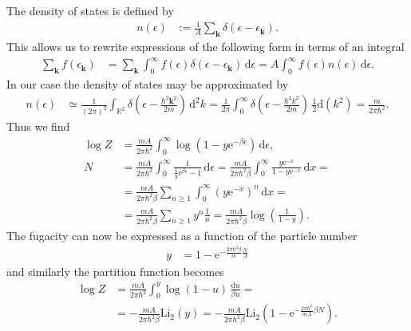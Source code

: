 \documentclass[english, parskip=full]{scrartcl}
\newcommand{\intx}{}
\newcommand{\intr}{}
\newcommand{\kla}{}
\newcommand{\tecxt}{}
\newcommand{\e}{\text{e}}
\begin{document}
The density of states is defined by
\begin{align}
n(\epsilon) &:= \frac{1}{A}\sum_\textbf{k} \delta(\epsilon - \epsilon_\textbf{k}).
\end{align}
This allows us to rewrite expressions of the following form in terms of an integral
\begin{align}
\sum_\textbf{k} f(\epsilon_\textbf{k}) &= \sum_\textbf{k} \intx\int_{0}^{\infty} f(\epsilon) \delta (\epsilon - \epsilon_\textbf{k}) \, \mathrm{d}\epsilon = A\int_{0}^{\infty} f(\epsilon) n(\epsilon)\, \mathrm{d}\epsilon.
\end{align}
In our case the density of states may be approximated by
\begin{align}
n(\epsilon) &\simeq \frac{1}{(2\pi)^2} \intr\int_{\mathbb{R}^{2}} \delta \kla\left( \epsilon - \frac{\hbar^2\textbf{k}^2}{2m} \right) \, \mathrm{d}^{2}k = \frac{1}{2\pi} \intx\int_{0}^{\infty} \delta \kla\left( \epsilon - \frac{\hbar^2k^2}{2m} \right) \, \frac{1}{2}\mathrm{d}(k^2) = \frac{m}{2\pi \hbar^2}.
\end{align}
Thus we find
\begin{align}
\log Z &= \frac{mA}{2\pi\hbar^2} \intx\int_{0}^{\infty} \log \kla\left( 1 - y\e^{-\beta\epsilon} \right) \, \mathrm{d}\epsilon,\\
N &= \frac{mA}{2\pi\hbar^2} \intx\int_{0}^{\infty} \frac{1}{\frac{1}{y} \e^{\beta\epsilon} - 1}\, \mathrm{d}\epsilon = \frac{mA}{2\pi\hbar^2\beta} \intx\int_{0}^{\infty} \frac{y\e^{-x}}{1 - y\e^{-x}}\, \mathrm{d}x = \\
&= \frac{mA}{2\pi\hbar^2\beta} \sum_{n\ge 1} \intx\int_{0}^{\infty} \kla\left( y\e^{-x} \right)^n\, \mathrm{d}x = \\
&=\frac{mA}{2\pi\hbar^2\beta} \sum_{n\ge 1} y^n \frac{1}{n} = \frac{mA}{2\pi\hbar^2\beta} \log \kla\left( \frac{1}{1 - y} \right).
\end{align}
The fugacity can now be expressed as a function of the particle number
\begin{align}
y &= 1 - \e^{-\frac{2\pi\hbar^2\beta}{m} \frac{N}{A}}
\end{align}
and similarly the partition function becomes
\begin{align}
\log Z &= \frac{mA}{2\pi\hbar^2} \intx\int_{0}^{y} \log\kla\left( 1 - u \right) \, \frac{\mathrm{d}u}{\beta u} = \\
&= -\frac{mA}{2\pi\hbar^2\beta} \tecxt\text{Li}_2(y) = -\frac{mA}{2\pi\hbar^2\beta} \tecxt\text{Li}_2 \kla\left( 1 - \e^{-\frac{2\pi\hbar^2}{mA} \beta N} \right).
\end{align}
\end{document}
